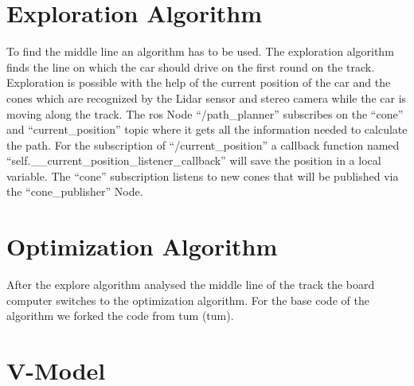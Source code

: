 \section{Exploration Algorithm} \label{sec:Exploration Algorithm}
To find the middle line an algorithm has to be used. The exploration algorithm finds the line on which the car should drive on the first round on the track. Exploration is possible with the help of the current position of the car and the cones which are recognized by the Lidar sensor and stereo camera while the car is moving along the track. The \acrshort{ros} Node ``/path\_planner'' subscribes on the ``cone'' and ``current\_position'' topic where it gets all the information needed to calculate the path. For the subscription of ``/current\_position'' a callback function named ``self.\_\_current\_position\_listener\_callback'' will save the position in a local variable. The ``cone'' subscription listens to new cones that will be published via the ``cone\_publisher'' Node.

\section{Optimization Algorithm} \label{sec:Optimization Algorithm}
After the explore algorithm analysed the middle line of the track the board computer switches to the optimization algorithm. For the base code of the algorithm we forked the code from \acrlong{tum} (\acrshort{tum}). \cite{tumftm_optimization_algoritm} 



\section{V-Model}
\lipsum[1]